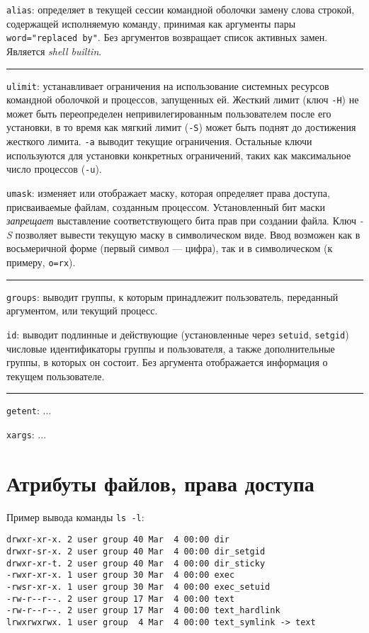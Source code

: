 \documentclass[listings]{labreport}
\begin{document}
\texttt{alias}: определяет в текущей сессии командной оболочки замену слова строкой, содержащей
исполняемую команду, принимая как аргументы пары \texttt{word="replaced by"}. Без аргументов
возвращает список активных замен. Является \textit{shell builtin}.

\noindent\rule{\textwidth}{1pt}

\texttt{ulimit}: устанавливает ограничения на использование системных ресурсов командной оболочкой
и процессов, запущенных ей. Жесткий лимит (ключ \texttt{-H}) не может быть переопределен
непривилегированным пользователем после его установки, в то время как мягкий лимит (\texttt{-S})
может быть поднят до достижения жесткого лимита. \texttt{-a} выводит текущие ограничения.
Остальные ключи используются для установки конкретных ограничений, таких как максимальное
число процессов (\texttt{-u}).

\texttt{umask}: изменяет или отображает маску, которая определяет права доступа, присваиваемые файлам,
созданным процессом. Установленный бит маски \textit{запрещает} выставление соответствующего бита прав
при создании файла. Ключ \textit{-S} позволяет вывести текущую маску в символическом виде. Ввод
возможен как в восьмеричной форме (первый символ — цифра), так и в символическом (к примеру, \texttt{o=rx}).

\noindent\rule{\textwidth}{1pt}

\texttt{groups}: выводит группы, к которым принадлежит пользователь, переданный аргументом, или текущий процесс.

\texttt{id}: выводит подлинные и действующие (установленные через \texttt{setuid}, \texttt{setgid})
числовые идентификаторы группы и пользователя, а также дополнительные группы, в которых он состоит.
Без аргумента отображается информация о текущем пользователе.

\noindent\rule{\textwidth}{1pt}

\texttt{getent}: ...

\texttt{xargs}: ...

\section*{Атрибуты файлов, права доступа}

Пример вывода команды \texttt{ls -l}:

\begin{verbatim}
drwxr-xr-x. 2 user group 40 Mar  4 00:00 dir
drwxr-sr-x. 2 user group 40 Mar  4 00:00 dir_setgid
drwxr-xr-t. 2 user group 40 Mar  4 00:00 dir_sticky
-rwxr-xr-x. 1 user group 30 Mar  4 00:00 exec
-rwsr-xr-x. 1 user group 30 Mar  4 00:00 exec_setuid
-rw-r--r--. 2 user group 17 Mar  4 00:00 text
-rw-r--r--. 2 user group 17 Mar  4 00:00 text_hardlink
lrwxrwxrwx. 1 user group  4 Mar  4 00:00 text_symlink -> text
\end{verbatim}
\end{document}
